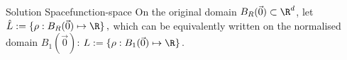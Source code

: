 \begin{definition}{Solution Space}{function-space}
  On the original domain $B_R(\vec{0}) \subset \R^d$, let
  $\functionspacehat := \{\rho: B_R(\vec{0}) \mapsto \R\}\,,$
  which can be equivalently written on the normalised domain $B_1(\vec{0})$:
  $\functionspace := \{\rho: B_1(\vec{0}) \mapsto \R\}\,.$
\end{definition}
